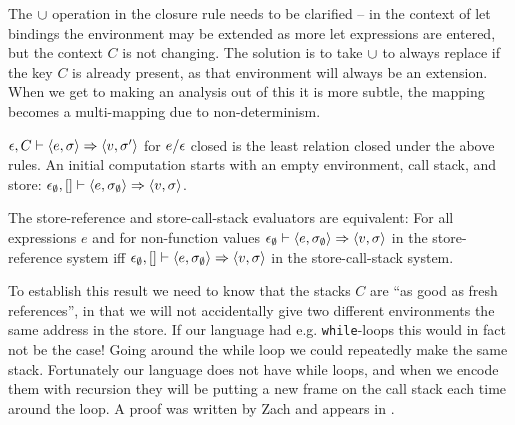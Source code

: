 The $\cup$ operation in the closure rule needs to be clarified -- in the context of let bindings the environment may be extended as more let expressions are entered, but the context $C$ is not changing.  The solution is to take $\cup$ to always replace if the key $C$ is already present, as that environment will always be an extension.  When we get to making an analysis out of this it is more subtle, the mapping becomes a multi-mapping due to non-determinism.

\begin{definition}
$\epsilon, C \vdash \langle e, \sigma \rangle \Rightarrow \langle v, \sigma' \rangle$ for $e/\epsilon$ closed is the least relation closed under the above rules.  An initial computation starts with an empty environment, call stack, and store: $\epsilon_\emptyset, [] \vdash \langle e, \sigma_\emptyset \rangle \Rightarrow \langle v,\sigma\rangle$.
\end{definition}

\begin{lemma} 
The store-reference and store-call-stack evaluators are equivalent:
 For all expressions $e$ and for non-function values $\epsilon_\emptyset \vdash \langle e, \sigma_\emptyset \rangle\Rightarrow \langle v,\sigma\rangle$ in the store-reference system iff  $\epsilon_\emptyset, [] \vdash \langle e, \sigma_\emptyset \rangle \Rightarrow \langle v,\sigma\rangle$ in the store-call-stack system.
\end{lemma}

To establish this result we need to know that the stacks $C$ are ``as good as fresh references'', in that we will not accidentally give two different environments the same address in the store.  If our language had e.g. {\tt while}-loops this would in fact not be the case!  Going around the while loop we could repeatedly make the same stack.  Fortunately our language does not have while loops, and when we encode them with recursion they will be putting a new frame on the call stack each time around the loop.  A proof was written by Zach and appears in \cite{DDPA}.

